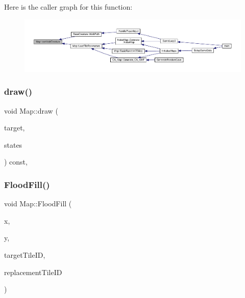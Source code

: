 Here is the caller graph for this function\+:
\nopagebreak
\begin{figure}[H]
\begin{center}
\leavevmode
\includegraphics[width=350pt]{class_map_a2ee6fd8a412c966c941784b226374bd1_icgraph}
\end{center}
\end{figure}
\mbox{\label{class_map_ab78fd8c747e184be9b86b993a60ca00b}} 
\subsubsection{\texorpdfstring{draw()}{draw()}}
{\footnotesize\ttfamily void Map\+::draw (\begin{DoxyParamCaption}\item[{sf\+::\+Render\+Target \&}]{target,  }\item[{sf\+::\+Render\+States}]{states }\end{DoxyParamCaption}) const\hspace{0.3cm}{\ttfamily [private]}, {\ttfamily [virtual]}}

\mbox{\label{class_map_af2d39f9bcdfea3c79c3670f79fc7f548}} 
\subsubsection{\texorpdfstring{Flood\+Fill()}{FloodFill()}\hspace{0.1cm}{\footnotesize\ttfamily [1/2]}}
{\footnotesize\ttfamily void Map\+::\+Flood\+Fill (\begin{DoxyParamCaption}\item[{int}]{x,  }\item[{int}]{y,  }\item[{int}]{target\+Tile\+ID,  }\item[{int}]{replacement\+Tile\+ID }\end{DoxyParamCaption})}

\mbox{\label{class_map_adeb884ce208e7fca98bb7d6c86c4ace6}} 
